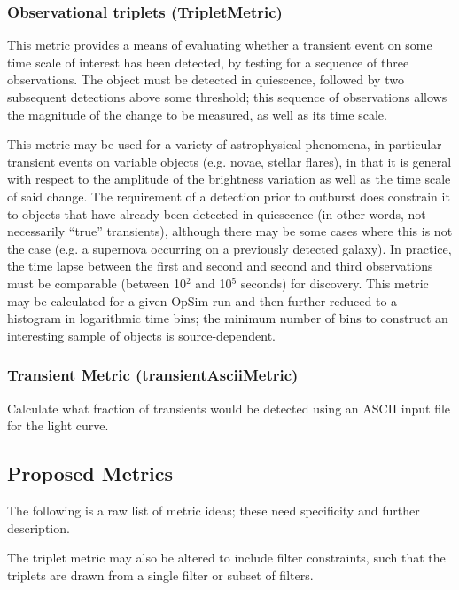 \subsubsection{Observational triplets (TripletMetric)}

This metric provides a means of evaluating whether a transient event
on some time scale of interest has been detected, by testing for a
sequence of three observations. The object must be detected in
quiescence, followed by two subsequent detections above some
threshold; this sequence of observations allows the magnitude of the
change to be measured, as well as its time scale.

This metric may be used for a variety of astrophysical phenomena, in
particular transient events on variable objects (e.g. novae, stellar
flares), in that it is general with respect to the amplitude of the
brightness variation as well as the time scale of said change. The
requirement of a detection prior to outburst does constrain it to
objects that have already been detected in quiescence (in other words,
not necessarily ``true'' transients), although there may be some cases
where this is not the case (e.g. a supernova occurring on a previously
detected galaxy). In practice, the time lapse between the first and
second and second and third observations must be comparable (between
10$^2$ and 10$^5$ seconds) for discovery. This metric may be
calculated for a given OpSim run and then further reduced to a
histogram in logarithmic time bins; the minimum number of bins to
construct an interesting sample of objects is source-dependent.

\subsubsection{Transient Metric (transientAsciiMetric)}

Calculate what fraction of transients would be detected using an ASCII
input file for the light curve.

\subsection{Proposed Metrics}

The following is a raw list of metric ideas; these need specificity
and further description.

The triplet metric may also be altered to include filter constraints,
such that the triplets are drawn from a single filter or subset of
filters.

